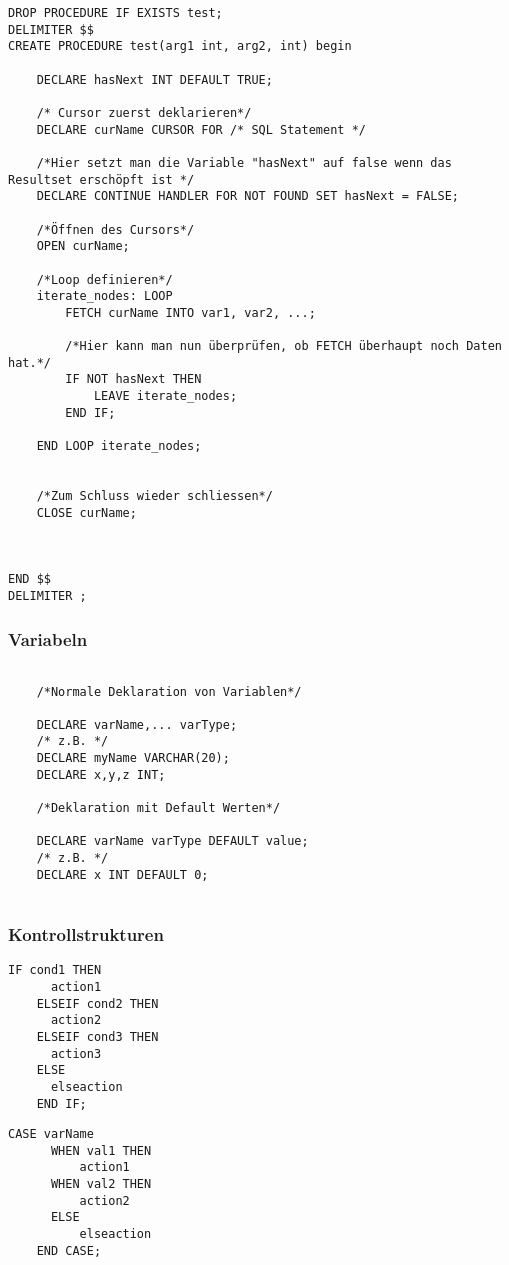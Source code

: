 \begin{lstlisting}[caption={Komplettbeispiel mit Cursor},label=lst:cursor_komplett]
DROP PROCEDURE IF EXISTS test;
DELIMITER $$
CREATE PROCEDURE test(arg1 int, arg2, int) begin
    
    DECLARE hasNext INT DEFAULT TRUE;
    
    /* Cursor zuerst deklarieren*/
    DECLARE curName CURSOR FOR /* SQL Statement */
    
    /*Hier setzt man die Variable "hasNext" auf false wenn das Resultset erschöpft ist */
    DECLARE CONTINUE HANDLER FOR NOT FOUND SET hasNext = FALSE;
    
    /*Öffnen des Cursors*/
    OPEN curName;
    
    /*Loop definieren*/    
    iterate_nodes: LOOP
        FETCH curName INTO var1, var2, ...;
        
        /*Hier kann man nun überprüfen, ob FETCH überhaupt noch Daten hat.*/
        IF NOT hasNext THEN 
            LEAVE iterate_nodes;
        END IF;
        
    END LOOP iterate_nodes;
    
    
    /*Zum Schluss wieder schliessen*/
    CLOSE curName;



END $$
DELIMITER ;
\end{lstlisting}

\subsubsection{Variabeln}
\begin{lstlisting}[caption={Variabeln},label=lst:vars]
    
    /*Normale Deklaration von Variablen*/

    DECLARE varName,... varType;
    /* z.B. */
    DECLARE myName VARCHAR(20); 
    DECLARE x,y,z INT;

    /*Deklaration mit Default Werten*/

    DECLARE varName varType DEFAULT value;
    /* z.B. */
    DECLARE x INT DEFAULT 0;
      
\end{lstlisting}

\subsubsection{Kontrollstrukturen}
\begin{lstlisting}[caption={If Else},label=lst:if]
    IF cond1 THEN
      action1
    ELSEIF cond2 THEN
      action2
    ELSEIF cond3 THEN
      action3
    ELSE
      elseaction
    END IF;
\end{lstlisting}
\begin{lstlisting}[caption={Select Case},label=lst:select_case]
    CASE varName
      WHEN val1 THEN 
          action1
      WHEN val2 THEN 
          action2
      ELSE 
          elseaction
    END CASE;

\end{lstlisting}

